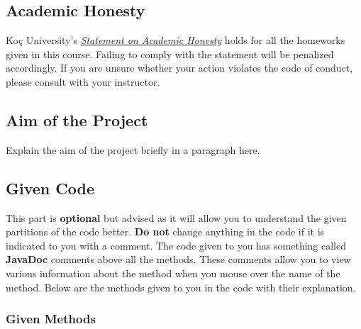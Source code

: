 \documentclass[a4paper]{article}
\begin{document}
\subsection{Academic Honesty}
Koç University's \emph{\href{https://vpaa.ku.edu.tr/sites/vpaa.ku.edu.tr/files/Misc_Documents/Statement_on_Academic_Honesty.pdf}{Statement on Academic Honesty}} holds for all the homeworks given in this course. Failing to comply with the statement will be penalized accordingly. If you are unsure whether your action violates the code of conduct, please consult with your instructor.

\subsection{Aim of the Project}
Explain the aim of the project briefly in a paragraph here.

\subsection{Given Code}
This part is \textbf{optional} but advised as it will allow you to understand the given partitions of the code better. \textbf{Do not} change anything in the code if it is indicated to you with a comment. The code given to you has something called \textbf{JavaDoc} comments above all the methods. These comments allow you to view various information about the method when you mouse over the name of the method. Below are the methods given to you in the code with their explanation.

\subsubsection{Given Methods}
\end{document}
